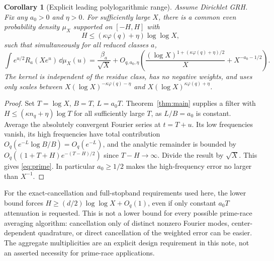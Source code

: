 \documentclass[11pt]{article}
\newtheorem{corollary}[theorem]{Corollary}
\theoremstyle{remark}\newtheorem{remark}[theorem]{Remark}
\begin{document}
\begin{corollary}[Explicit leading polylogarithmic range]\label{cor:prime}
Assume Dirichlet GRH. Fix any $a_0>0$ and $\eta>0$. For sufficiently large $X$, there is a common even probability density $\mu_X$ supported on $[-H,H]$ with
\[
 H\le(\kappa\varphi(q)+\eta)\log\log X,
\]
such that simultaneously for all reduced classes $a$,
\begin{equation}\label{eq:prime}
 \int e^{u/2}R_a(Xe^u)\,\dd\mu_X(u)=\frac{\beta_a}{\sqrt X}
 +O_{q,a_0,\eta}\left(\frac{(\log X)^{1+(\kappa\varphi(q)+\eta)/2}}{X}+X^{-a_0-1/2}\right).
\end{equation}
The kernel is independent of the residue class, has no negative weights, and uses only scales between $X(\log X)^{-\kappa\varphi(q)-\eta}$ and $X(\log X)^{\kappa\varphi(q)+\eta}$.
\end{corollary}
\begin{proof}
Set $T=\log X$, $B=T$, $L=a_0T$. Theorem~\ref{thm:main} supplies a filter with $H\le(\kappa n_q+\eta)\log T$ for all sufficiently large $T$, as $L/B=a_0$ is constant. Average the absolutely convergent Fourier series at $t=T+u$. Its low frequencies vanish, its high frequencies have total contribution $O_q(e^{-L}\log B/B)=O_q(e^{-L})$, and the analytic remainder is bounded by $O_q((1+T+H)e^{-(T-H)/2})$ since $T-H\to\infty$. Divide the result by $\sqrt X$. This gives \eqref{eq:prime}. In particular $a_0\ge1/2$ makes the high-frequency error no larger than $X^{-1}$.
\end{proof}

For the exact-cancellation and full-stopband requirements used here, the lower bound forces $H\ge(d/2)\log\log X+O_q(1)$, even if only constant $a_0T$ attenuation is requested. This is not a lower bound for every possible prime-race averaging algorithm: cancellation only of distinct nonzero Fourier modes, center-dependent quadrature, or direct cancellation of the weighted error can be easier. The aggregate multiplicities are an explicit design requirement in this note, not an asserted necessity for prime-race applications.
\end{document}
